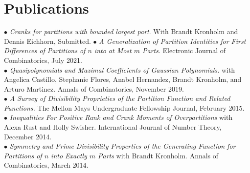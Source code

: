 \documentclass[letterpaper]{article}
\begin{document}
\section*{{\bf Publications}}
$\bullet$ \textit{Cranks for partitions with bounded largest part}. With Brandt Kronholm and Dennis Eichhorn, Submitted.
$\bullet$ \textit{A Generalization of Partition Identities for First Differences of Partitions of $n$ into at Most $m$ Parts}. Electronic Journal of Combinatorics, July 2021. \vspace{.2cm}\\
$\bullet$ \textit{Quasipolynomials and Maximal Coefficients of Gaussian Polynomials.} with Angelica Castillo, Stephanie Flores, Anabel Hernandez, Brandt Kronholm, and Arturo Martinez. Annals of Combinatorics, November 2019.\vspace{.2cm}\\ 
$\bullet$ \textit{A Survey of Divisibility Proprieties of the Partition Function and Related Functions.}  The Mellon Mays Undergraduate Fellowship Journal, February 2015. \vspace{.2cm}\\
$\bullet$ \textit{Inequalities For Positive Rank and Crank Moments of Overpartitions} with Alexa Rust and Holly Swisher. International Journal of Number Theory, December 2014. \vspace{.2cm}\\
$\bullet$ \textit{Symmetry and Prime Divisibility Properties of the Generating Function for Partitions of $n$ into Exactly $m$ Parts} with Brandt Kronholm. Annals of Combinatorics, March 2014. \\

\end{document}

